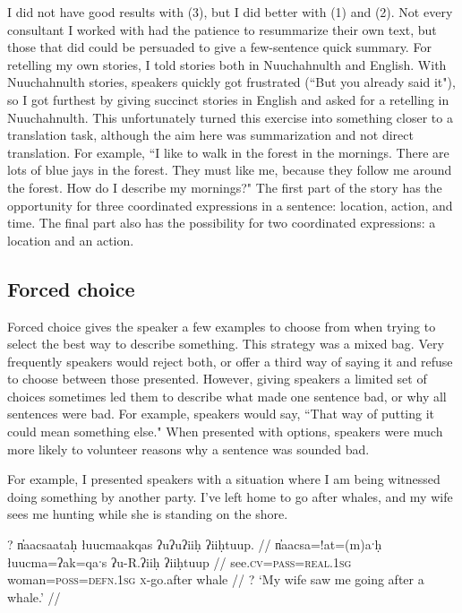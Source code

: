I did not have good results with (3), but I did better with (1) and (2). Not every consultant I worked with had the patience to resummarize their own text, but those that did could be persuaded to give a few-sentence quick summary. For retelling my own stories, I told stories both in Nuuchahnulth and English. With Nuuchahnulth stories, speakers quickly got frustrated (``But you already said it"), so I got furthest by giving succinct stories in English and asked for a retelling in Nuuchahnulth. This unfortunately turned this exercise into something closer to a translation task, although the aim here was summarization and not direct translation. For example, ``I like to walk in the forest in the mornings. There are lots of blue jays in the forest. They must like me, because they follow me around the forest. How do I describe my mornings?" The first part of the story has the opportunity for three coordinated expressions in a sentence: location, action, and time. The final part also has the possibility for two coordinated expressions: a location and an action. 

\subsection{Forced choice}

Forced choice gives the speaker a few examples to choose from when trying to select the best way to describe something. This strategy was a mixed bag. Very frequently speakers would reject both, or offer a third way of saying it and refuse to choose between those presented. However, giving speakers a limited set of choices sometimes led them to describe what made one sentence bad, or why all sentences were bad. For example, speakers would say, ``That way of putting it could mean something else." When presented with options, speakers were much more likely to volunteer reasons why a sentence was sounded bad.

For example, I presented speakers with a situation where I am being witnessed doing something by another party. I've left home to go after whales, and my wife sees me hunting while she is standing on the shore.

\ex \label{ex:goingafterwhale1}
\begingl
\glpreamble ? n̓aacsaataḥ łuucmaakqas ʔuʔuʔiiḥ ʔiiḥtuup. //
\gla n̓aacsa=!at=(m)aˑḥ łuucma=ʔak=qaˑs ʔu-R.ʔiiḥ ʔiiḥtuup //
\glb see.\textsc{cv}=\textsc{pass}=\textsc{real.1sg} woman=\textsc{poss}=\textsc{defn.1sg} \textsc{x}-go.after whale //
\glft ? `My wife saw me going after a whale.' //
\endgl
\xe

